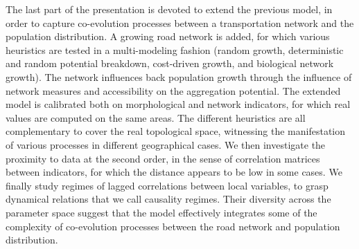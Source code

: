 \documentclass[11pt]{article}
\begin{document}
The last part of the presentation is devoted to extend the previous model, in order to capture co-evolution processes between a transportation network and the population distribution. A growing road network is added, for which various heuristics are tested in a multi-modeling fashion (random growth, deterministic and random potential breakdown, cost-driven growth, and biological network growth). The network influences back population growth through the influence of network measures and accessibility on the aggregation potential. The extended model is calibrated both on morphological and network indicators, for which real values are computed on the same areas. The different heuristics are all complementary to cover the real topological space, witnessing the manifestation of various processes in different geographical cases. We then investigate the proximity to data at the second order, in the sense of correlation matrices between indicators, for which the distance appears to be low in some cases. We finally study regimes of lagged correlations between local variables, to grasp dynamical relations that we call causality regimes. Their diversity across the parameter space suggest that the model effectively integrates some of the complexity of co-evolution processes between the road network and population distribution.











%
\end{document}

